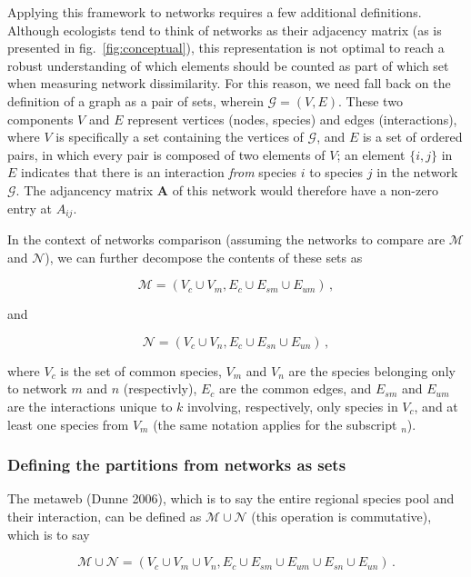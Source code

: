 \documentclass[11pt]{article}
\begin{document}
Applying this framework to networks requires a few additional
definitions. Although ecologists tend to think of networks as their
adjacency matrix (as is presented in fig.~\ref{fig:conceptual}), this
representation is not optimal to reach a robust understanding of which
elements should be counted as part of which set when measuring network
dissimilarity. For this reason, we need fall back on the definition of a
graph as a pair of sets, wherein \(\mathcal{G} = (V, E)\). These two
components \(V\) and \(E\) represent vertices (nodes, species) and edges
(interactions), where \(V\) is specifically a set containing the
vertices of \(\mathcal{G}\), and \(E\) is a set of ordered pairs, in
which every pair is composed of two elements of \(V\); an element
\(\{i,j\}\) in \(E\) indicates that there is an interaction \emph{from}
species \(i\) to species \(j\) in the network \(\mathcal{G}\). The
adjancency matrix \(\mathbf{A}\) of this network would therefore have a
non-zero entry at \(A_{ij}\).

In the context of networks comparison (assuming the networks to compare
are \(\mathcal{M}\) and \(\mathcal{N}\)), we can further decompose the
contents of these sets as

\[\mathcal{M} = (V_c \cup V_m, E_c \cup E_{sm} \cup E_{um}) \,,\]

and

\[\mathcal{N} = (V_c \cup V_n, E_c \cup E_{sn} \cup E_{un}) \,,\]

where \(V_c\) is the set of common species, \(V_m\) and \(V_n\) are the
species belonging only to network \(m\) and \(n\) (respectivly), \(E_c\)
are the common edges, and \(E_{sm}\) and \(E_{um}\) are the interactions
unique to \(k\) involving, respectively, only species in \(V_c\), and at
least one species from \(V_m\) (the same notation applies for the
subscript \(_{n}\)).

\hypertarget{defining-the-partitions-from-networks-as-sets}{%
\subsubsection{Defining the partitions from networks as
sets}\label{defining-the-partitions-from-networks-as-sets}}

The metaweb (Dunne 2006), which is to say the entire regional species
pool and their interaction, can be defined as
\(\mathcal{M} \cup \mathcal{N}\) (this operation is commutative), which
is to say

\[\mathcal{M} \cup \mathcal{N} = (V_c \cup V_m \cup V_n, E_c \cup E_{sm} \cup E_{um} \cup E_{sn} \cup E_{un}) \,.\]
\end{document}

